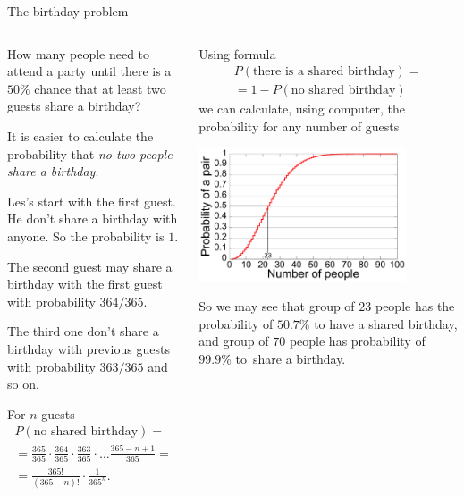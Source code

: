 \documentclass[9pt,aspectratio=169]{beamer}
\begin{document}
\begin{frame}{The birthday problem}
  \begin{columns}[T]
    \begin{column}{0.5\textwidth}
      \begin{problem}
        How many people need to attend a party until there is a $50\%$ chance that at least two guests share a birthday?
      \end{problem}
      It is easier to calculate the probability that \emph{no two people share a birthday}. 
      
      Les's start with the first guest. He don't share a birthday with anyone. So the probability is $1$.
      
      The second guest may share a birthday with the first guest with probability $364/365$. 
      
      The third one don't share a birthday with previous guests with probability $363/365$ and so on. 
      
      For $n$ guests
      \begin{multline*}
        P(\text{no shared birthday}) = \\
        = \frac{365}{365} \cdot \frac{364}{365} \cdot \frac{363}{365} \cdot \ldots \frac{365 - n + 1}{365} = \\ = \frac{365!}{(365-n)!} \cdot \frac{1}{365^n}.
      \end{multline*}
    \end{column}
    \begin{column}{0.5\textwidth}
      Using formula 
      \begin{multline*}
         P(\text{there is a shared birthday}) = \\ 
         = 1 - P(\text{no shared birthday})
      \end{multline*}
      we can calculate, using computer, the probability for any number of guests
      \begin{center}
        \vspace*{-1ex}   
        \includegraphics[width = 0.80\textwidth]{03 - Probability/Birthday_Paradox.pdf}
        \vspace*{-1ex}   
      \end{center} 
      So we may see that group of $23$ people has the probability of $50.7\%$ to have a shared birthday, and group of $70$ people has probability of $99.9\%$ to~share a birthday.
    \end{column}
  \end{columns}
\end{frame}
\end{document}
